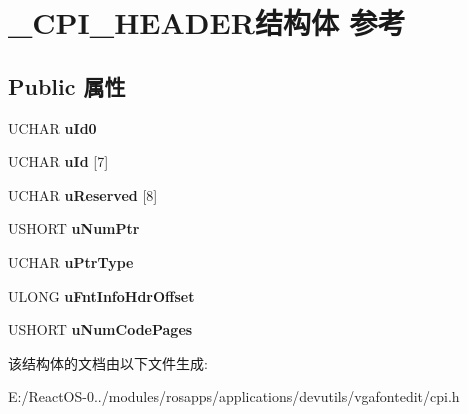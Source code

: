 \hypertarget{struct___c_p_i___h_e_a_d_e_r}{}\section{\+\_\+\+C\+P\+I\+\_\+\+H\+E\+A\+D\+E\+R结构体 参考}
\label{struct___c_p_i___h_e_a_d_e_r}
\subsection*{Public 属性}
\begin{DoxyCompactItemize}
\item 
\mbox{\label{struct___c_p_i___h_e_a_d_e_r_a2f46185c3f2fd3b0ce30182d5d69c836}} 
U\+C\+H\+AR {\bfseries u\+Id0}
\item 
\mbox{\label{struct___c_p_i___h_e_a_d_e_r_ae581d472744067c2045f9314b5421703}} 
U\+C\+H\+AR {\bfseries u\+Id} \mbox{[}7\mbox{]}
\item 
\mbox{\label{struct___c_p_i___h_e_a_d_e_r_aee4481473d0749385ad142e482ae12da}} 
U\+C\+H\+AR {\bfseries u\+Reserved} \mbox{[}8\mbox{]}
\item 
\mbox{\label{struct___c_p_i___h_e_a_d_e_r_a364f39e3f4eccf08319cb57645d21948}} 
U\+S\+H\+O\+RT {\bfseries u\+Num\+Ptr}
\item 
\mbox{\label{struct___c_p_i___h_e_a_d_e_r_a76935056ced0c0a707b6d8bd25de5f56}} 
U\+C\+H\+AR {\bfseries u\+Ptr\+Type}
\item 
\mbox{\label{struct___c_p_i___h_e_a_d_e_r_a45fe6f74b27a3b56724ac05075ca285d}} 
U\+L\+O\+NG {\bfseries u\+Fnt\+Info\+Hdr\+Offset}
\item 
\mbox{\label{struct___c_p_i___h_e_a_d_e_r_ada0b6c5274a14fd7aeb1367232219165}} 
U\+S\+H\+O\+RT {\bfseries u\+Num\+Code\+Pages}
\end{DoxyCompactItemize}


该结构体的文档由以下文件生成\+:\begin{DoxyCompactItemize}
\item 
E\+:/\+React\+O\+S-\/0../modules/rosapps/applications/devutils/vgafontedit/cpi.\+h\end{DoxyCompactItemize}

